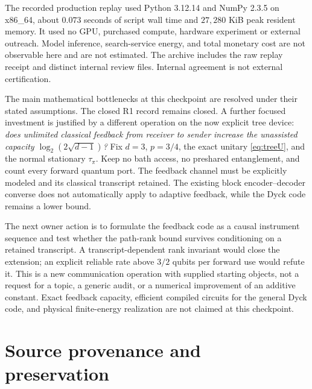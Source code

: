 \documentclass[11pt]{article}
\theoremstyle{definition}\newtheorem{definition}[theorem]{Definition}
\begin{document}
The recorded production replay used Python 3.12.14 and NumPy 2.3.5 on x86\_64, about $0.073$ seconds of script wall time and $27{,}280$ KiB peak resident memory. It used no GPU, purchased compute, hardware experiment or external outreach. Model inference, search-service energy, and total monetary cost are not observable here and are not estimated. The archive includes the raw replay receipt and distinct internal review files. Internal agreement is not external certification.

The main mathematical bottlenecks at this checkpoint are resolved under their stated assumptions. The closed R1 record remains closed. A further focused investment is justified by a different operation on the now explicit tree device: \emph{does unlimited classical feedback from receiver to sender increase the unassisted capacity $\log_2(2\sqrt{d-1})$?} Fix $d=3$, $p=3/4$, the exact unitary \eqref{eq:treeU}, and the normal stationary $\tau_\pi$. Keep no bath access, no preshared entanglement, and count every forward quantum port. The feedback channel must be explicitly modeled and its classical transcript retained. The existing block encoder--decoder converse does not automatically apply to adaptive feedback, while the Dyck code remains a lower bound.

The next owner action is to formulate the feedback code as a causal instrument sequence and test whether the path-rank bound survives conditioning on a retained transcript. A transcript-dependent rank invariant would close the extension; an explicit reliable rate above $3/2$ qubits per forward use would refute it. This is a new communication operation with supplied starting objects, not a request for a topic, a generic audit, or a numerical improvement of an additive constant. Exact feedback capacity, efficient compiled circuits for the general Dyck code, and physical finite-energy realization are not claimed at this checkpoint.

\appendix
\section{Source provenance and preservation}
\end{document}
